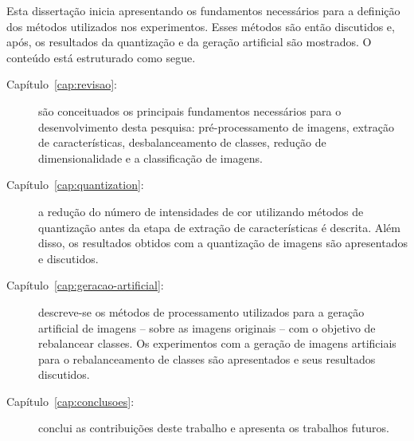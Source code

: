 Esta dissertação inicia apresentando os fundamentos necessários para a definição dos métodos utilizados nos experimentos. Esses métodos são então discutidos e, após, os resultados da quantização e da geração artificial são mostrados. O conteúdo está estruturado como segue.

\begin{description}
\item [Capítulo~\ref{cap:revisao}:] são conceituados os principais fundamentos necessários para o desenvolvimento desta pesquisa: pré-processamento de imagens, extração de características, desbalanceamento de classes, redução de dimensionalidade e a classificação de imagens.

\item [Capítulo~\ref{cap:quantization}:] a redução do número de intensidades de cor utilizando métodos de quantização antes da etapa de extração de características é descrita. Além disso, os resultados obtidos com a quantização de imagens são apresentados e discutidos.

\item [Capítulo~\ref{cap:geracao-artificial}:] descreve-se os métodos de processamento utilizados para a geração artificial de imagens -- sobre as imagens originais -- com o objetivo de rebalancear classes. Os experimentos com a geração de imagens artificiais para o rebalanceamento de classes são apresentados e seus resultados discutidos.

\item [Capítulo~\ref{cap:conclusoes}:] conclui as contribuições deste trabalho e apresenta os trabalhos futuros.

\end{description}
